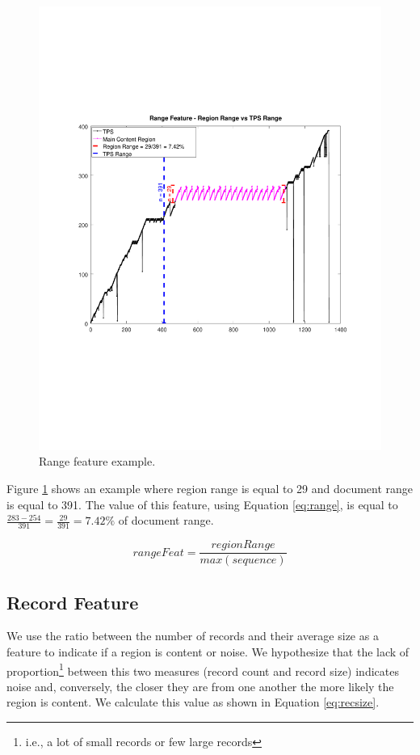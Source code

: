\begin{figure}[h]
  \centering
     \includegraphics[trim={2.5cm 7.4cm 2.2cm 7.4cm}, clip,  width=\columnwidth]{img/range.pdf}
  \caption{Range feature example.}
  \label{fig:range}
\end{figure}

Figure \ref{fig:range} shows an example where region range is equal to 29 and
document range is equal to 391. The value of this feature, using Equation
\ref{eq:range}, is equal to $\frac{283-254}{391}=\frac{29}{391}=7.42\%$ of
document range.

\begin{equation}\label{eq:range}
    rangeFeat = \frac{regionRange}{max(sequence)}
\end{equation}

\subsection{Record Feature}\label{ss:rec}
We use the ratio between the number of records and their average size as a
feature to indicate if a region is content or noise. We hypothesize that the
lack of proportion\footnote{i.e., a lot of small records or few large records}
between this two measures (record count and record size) indicates noise and,
conversely, the closer they are from one another the more likely the region is
content. We calculate this value as shown in Equation \ref{eq:recsize}.

